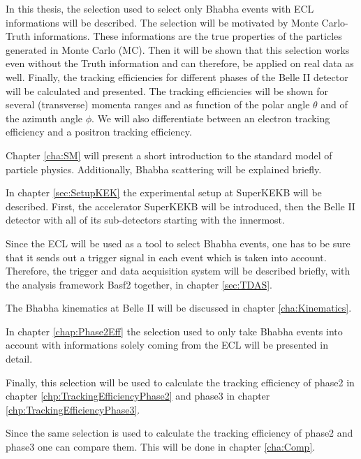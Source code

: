 \documentclass[a4paper,11pt,twosided,final,german,openbib,pdftex,listof=totoc,bibliography=totoc]{scrbook}
\begin{document}
In this thesis, the selection used to select only Bhabha events with ECL informations will be described. The selection will be motivated by Monte Carlo-Truth informations. These informations are the true properties of the particles generated in Monte Carlo (MC). Then it will be shown that this selection works even without the Truth information and can therefore, be applied on real data as well. Finally, the tracking efficiencies for different phases of the Belle II detector will be calculated and presented. The tracking efficiencies will be shown for several (transverse) momenta ranges and as function of the polar angle $\theta$ and of the azimuth angle $\phi$. We will also differentiate between an electron tracking efficiency and a positron tracking efficiency.
\newline




Chapter \ref{cha:SM} will present a short introduction to the standard model of particle physics. Additionally, Bhabha scattering will be explained briefly. 

In chapter \ref{sec:SetupKEK} the experimental setup at SuperKEKB will be described. First, the accelerator SuperKEKB will be introduced, then the Belle II detector with all of its sub-detectors starting with the innermost.

Since the ECL will be used as a tool to select Bhabha events, one has to be sure that it sends out a trigger signal in each event which is taken into account. Therefore, the trigger and data acquisition system will be described briefly, with the analysis framework Basf2 together, in chapter \ref{sec:TDAS}.  


The Bhabha kinematics at Belle II will be discussed in chapter \ref{cha:Kinematics}.

In chapter \ref{chap:Phase2Eff} the selection used to only take Bhabha events into account with informations solely coming from the ECL will be presented in detail. 

Finally, this selection will be used to calculate the tracking efficiency of phase2 in chapter \ref{chp:TrackingEfficiencyPhase2} and phase3 in chapter \ref{chp:TrackingEfficiencyPhase3}.

Since the same selection is used to calculate the tracking efficiency of phase2 and phase3 one can compare them. This will be done in chapter \ref{cha:Comp}.
\end{document}
